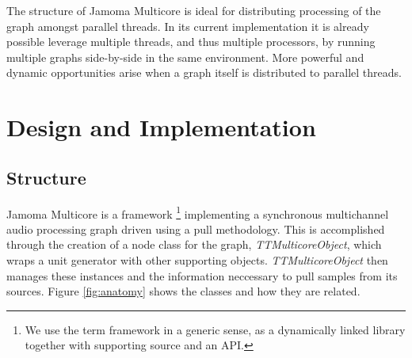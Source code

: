 \documentclass[twoside,a4paper]{article}
\begin{document}
The structure of Jamoma Multicore is ideal for distributing processing of the graph amongst parallel threads.  In its current implementation it is already possible leverage multiple threads, and thus multiple processors, by running multiple graphs side-by-side in the same environment.  More powerful and dynamic opportunities arise when a graph itself is distributed to parallel threads.

%   











\section{Design and Implementation} %

\subsection{Structure} %

Jamoma Multicore is a framework \footnote{We use the term framework in a generic sense, as a dynamically linked library together with supporting source and an API.} implementing a synchronous multichannel audio processing graph driven using a pull methodology.  This is accomplished through the creation of a node class for the graph, \emph{TTMulticoreObject}, which wraps a unit generator with other supporting objects.  \emph{TTMulticoreObject} then manages these instances and the information neccessary to pull samples from its sources.  Figure \ref{fig:anatomy} shows the classes and how they are related.
\end{document}
